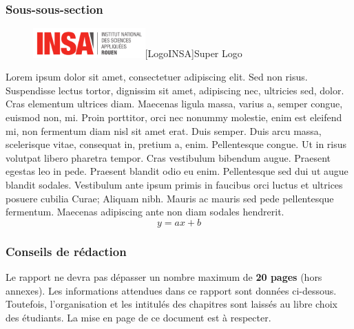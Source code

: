 \documentclass[a4paper, 12pt]{report}
\begin{document}
				\subsubsection{Sous-sous-section}


\begin{figure}[h]
\centering
\vspace{-0.6cm} 
\includegraphics[width=43mm]{images/insalogo2.png}[LogoINSA]{Super Logo}
\end{figure}



	Lorem ipsum dolor sit amet, consectetuer adipiscing elit. Sed non risus. Suspendisse lectus tortor, dignissim sit amet, adipiscing nec, ultricies sed, dolor. Cras elementum ultrices diam. Maecenas ligula massa, varius a, semper congue, euismod non, mi. Proin porttitor, orci nec nonummy molestie, enim est eleifend mi, non fermentum diam nisl sit amet erat. Duis semper. Duis arcu massa, scelerisque vitae, consequat in, pretium a, enim. Pellentesque congue. Ut in risus volutpat libero pharetra tempor. Cras vestibulum bibendum augue. Praesent egestas leo in pede. Praesent blandit odio eu enim. Pellentesque sed dui ut augue blandit sodales. Vestibulum ante ipsum primis in faucibus orci luctus et ultrices posuere cubilia Curae; Aliquam nibh. Mauris ac mauris sed pede pellentesque fermentum. Maecenas adipiscing ante non diam sodales hendrerit.\\

\begin{equation}
	y = a x + b
\end{equation}

				\subsubsection{Conseils de rédaction}

	Le rapport ne devra pas dépasser un nombre maximum de \textbf{20 pages} (hors annexes). Les informations attendues dans ce rapport sont données ci-dessous. Toutefois, l’organisation et les intitulés des chapitres sont laissés au libre choix des étudiants. La mise en page de ce document est à respecter. 
\end{document}

